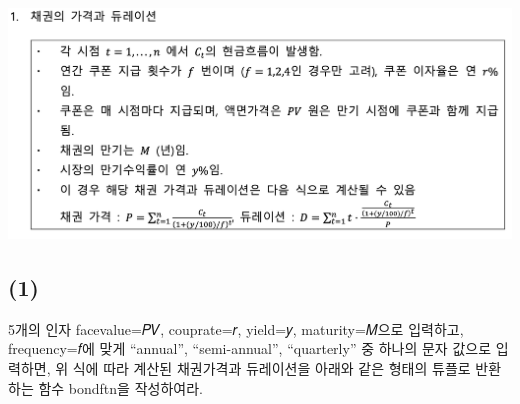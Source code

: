 \documentclass[
  letterpaper,
  DIV=11,
  numbers=noendperiod]{scrreprt}
\begin{document}

\includegraphics{images/Python_midterm1.png}

\subsection*{(1)}\label{section-17}

5개의 인자 facevalue=𝑃𝑉, couprate=𝑟, yield=𝑦, maturity=𝑀으로 입력하고,
frequency=𝑓에 맞게 ``annual'', ``semi-annual'', ``quarterly'' 중 하나의
문자 값으로 입력하면, 위 식에 따라 계산된 채권가격과 듀레이션을 아래와
같은 형태의 튜플로 반환하는 함수 bondftn을 작성하여라.
\end{document}
